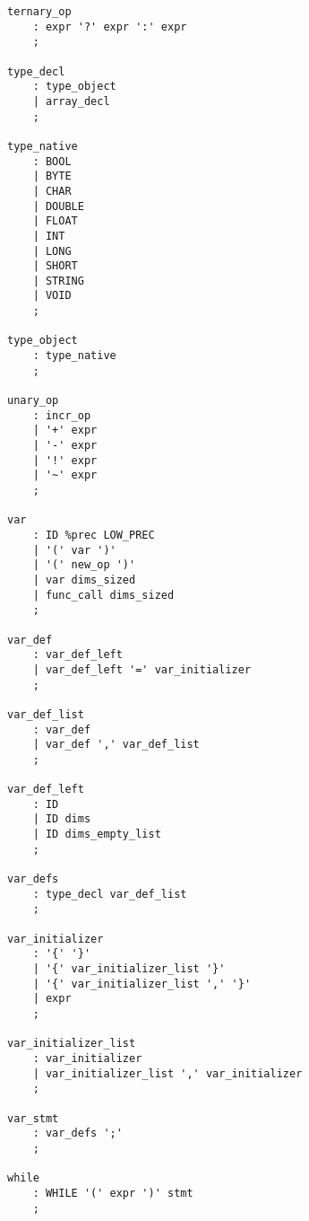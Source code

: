 \documentclass[a4paper]{article}
\begin{document}
\begin{verbatim}
ternary_op
	: expr '?' expr ':' expr
	;

type_decl
	: type_object
	| array_decl
	;

type_native
	: BOOL
	| BYTE
	| CHAR
	| DOUBLE
	| FLOAT
	| INT
	| LONG
	| SHORT
	| STRING
	| VOID
	;

type_object
	: type_native
	;

unary_op
	: incr_op
	| '+' expr
	| '-' expr
	| '!' expr
	| '~' expr
	;

var
	: ID %prec LOW_PREC
	| '(' var ')'
	| '(' new_op ')'
	| var dims_sized
	| func_call dims_sized
	;

var_def
	: var_def_left
	| var_def_left '=' var_initializer
	;

var_def_list
	: var_def
	| var_def ',' var_def_list
	;

var_def_left
	: ID
	| ID dims
	| ID dims_empty_list
	;

var_defs
	: type_decl var_def_list
	;

var_initializer
	: '{' '}'
	| '{' var_initializer_list '}'
	| '{' var_initializer_list ',' '}'
	| expr
	;

var_initializer_list
	: var_initializer
	| var_initializer_list ',' var_initializer
 	;

var_stmt															
	: var_defs ';'
	;

while
	: WHILE '(' expr ')' stmt
	;
\end{verbatim}
\end{document}
